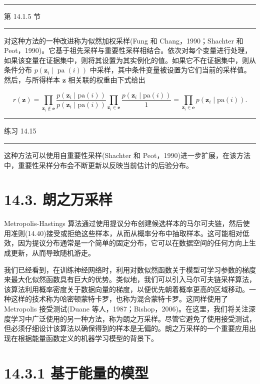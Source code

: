 \documentclass[10pt]{report}
\newcommand{\HRule}{\begin{center}\rule{0.9\linewidth}{0.2mm}\end{center}}
\begin{document}
\HRule

第 14.1.5 节

\HRule

对这种方法的一种改进称为似然加权采样(Fung 和 Chang，1990；Shachter 和 Peot，1990)。它基于祖先采样与重要性采样相结合。依次对每个变量进行处理，如果该变量在证据集中，则将其设置为其实例化的值。如果它不在证据集中，则从条件分布 \(p\left( {{\mathbf{z}}_{i} \mid  \operatorname{pa}\left( i\right) }\right)\) 中采样，其中条件变量被设置为它们当前的采样值。然后，与所得样本 \(\mathbf{z}\) 相关联的权重由下式给出

\[
r\left( \mathbf{z}\right)  = \mathop{\prod }\limits_{{{\mathbf{z}}_{i} \notin  \mathbf{e}}}\frac{p\left( {{\mathbf{z}}_{i} \mid  \mathrm{{pa}}\left( i\right) }\right) }{p\left( {{\mathbf{z}}_{i} \mid  \mathrm{{pa}}\left( i\right) }\right) }\mathop{\prod }\limits_{{{\mathbf{z}}_{i} \in  \mathbf{e}}}\frac{p\left( {{\mathbf{z}}_{i} \mid  \mathrm{{pa}}\left( i\right) }\right) }{1} = \mathop{\prod }\limits_{{{\mathbf{z}}_{i} \in  \mathbf{e}}}p\left( {{\mathbf{z}}_{i} \mid  \mathrm{{pa}}\left( i\right) }\right) . \tag{14.48}
\]

\HRule

练习 14.15

\HRule

这种方法可以使用自重要性采样(Shachter 和 Peot，1990)进一步扩展，在该方法中，重要性采样分布会不断更新以反映当前估计的后验分布。

\section*{14.3. 朗之万采样}

Metropolis-Hastings 算法通过使用提议分布创建候选样本的马尔可夫链，然后使用准则(14.40)接受或拒绝这些样本，从而从概率分布中抽取样本。这可能相对低效，因为提议分布通常是一个简单的固定分布，它可以在数据空间的任何方向上生成更新，从而导致随机游走。

我们已经看到，在训练神经网络时，利用对数似然函数关于模型可学习参数的梯度来最大化似然函数具有巨大的优势。类似地，我们可以引入马尔可夫链采样算法，该算法利用概率密度关于数据向量的梯度，以便优先朝着概率更高的区域移动。一种这样的技术称为哈密顿蒙特卡罗，也称为混合蒙特卡罗。这同样使用了 Metropolis 接受测试(Duane 等人，1987；Bishop，2006)。在这里，我们将关注深度学习中广泛使用的另一种方法，称为朗之万采样。尽管它避免了使用接受测试，但必须仔细设计该算法以确保得到的样本是无偏的。朗之万采样的一个重要应用出现在根据能量函数定义的机器学习模型的背景下。

\section*{14.3.1 基于能量的模型}
\end{document}
